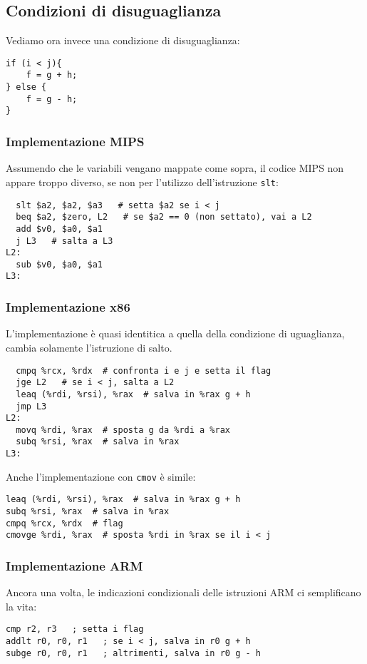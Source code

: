 \documentclass[class=book, crop=false, oneside]{standalone}
\begin{document}
\subsection*{Condizioni di disuguaglianza}
Vediamo ora invece una condizione di disuguaglianza:
\begin{verbatim}
if (i < j){
	f = g + h;
} else {
	f = g - h;
}
\end{verbatim}
\subsubsection{Implementazione MIPS}
Assumendo che le variabili vengano mappate come sopra, il codice MIPS non appare troppo diverso, se non per l'utilizzo dell'istruzione \texttt{slt}:
\begin{verbatim}
  slt $a2, $a2, $a3   # setta $a2 se i < j
  beq $a2, $zero, L2   # se $a2 == 0 (non settato), vai a L2
  add $v0, $a0, $a1
  j L3   # salta a L3
L2:
  sub $v0, $a0, $a1
L3:
\end{verbatim}
\subsubsection{Implementazione x86}
L'implementazione è quasi identitica a quella della condizione di uguaglianza, cambia solamente l'istruzione di salto.
\begin{verbatim}
  cmpq %rcx, %rdx  # confronta i e j e setta il flag
  jge L2   # se i < j, salta a L2
  leaq (%rdi, %rsi), %rax  # salva in %rax g + h
  jmp L3
L2:
  movq %rdi, %rax  # sposta g da %rdi a %rax
  subq %rsi, %rax  # salva in %rax
L3:
\end{verbatim}
Anche l'implementazione con \texttt{cmov} è simile:
\begin{verbatim}
leaq (%rdi, %rsi), %rax  # salva in %rax g + h
subq %rsi, %rax  # salva in %rax
cmpq %rcx, %rdx  # flag
cmovge %rdi, %rax  # sposta %rdi in %rax se il i < j
\end{verbatim}

\subsubsection{Implementazione ARM}
Ancora una volta, le indicazioni condizionali delle istruzioni ARM ci semplificano la vita:
\begin{verbatim}
cmp r2, r3   ; setta i flag
addlt r0, r0, r1   ; se i < j, salva in r0 g + h
subge r0, r0, r1   ; altrimenti, salva in r0 g - h
\end{verbatim}
\end{document}
